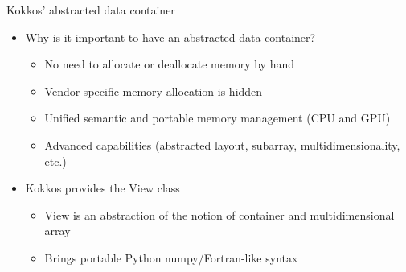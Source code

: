 \documentclass[aspectratio=169]{beamer}
\begin{document}
\begin{frame}[fragile]{Kokkos' abstracted data container}
    \begin{itemize}
        \item Why is it important to have an abstracted data container?
        \begin{itemize}
            \item No need to allocate or deallocate memory by hand
            \item Vendor-specific memory allocation is hidden
            \item Unified semantic and portable memory management (CPU and GPU)
            \item Advanced capabilities (abstracted layout, subarray, multidimensionality, etc.)
        \end{itemize}
        \item Kokkos provides the View class
        \begin{itemize}
            \item View is an abstraction of the notion of container and multidimensional array
            \item Brings portable Python numpy/Fortran-like syntax
        \end{itemize}
    \end{itemize}
\end{frame}

\end{document}
